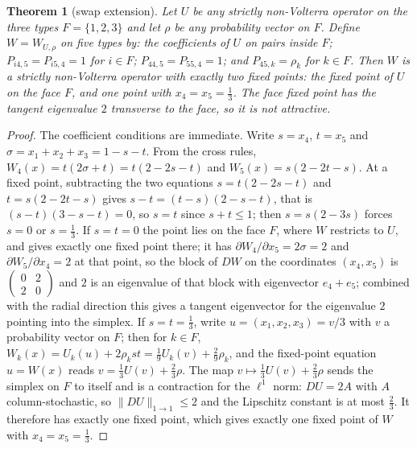 \documentclass[11pt]{amsart}
\newtheorem{theorem}{Theorem}[section]
\theoremstyle{definition}
\begin{document}
\begin{theorem}[swap extension]\label{thm:swap}
Let $U$ be any strictly non-Volterra operator on the three types $F=\{1,2,3\}$ and let $\rho$ be any probability vector on $F$. Define $W=W_{U,\rho}$ on five types by: the coefficients of $U$ on pairs inside $F$; $P_{i4,5}=P_{i5,4}=1$ for $i\in F$; $P_{44,5}=P_{55,4}=1$; and $P_{45,k}=\rho_k$ for $k\in F$. Then $W$ is a strictly non-Volterra operator with exactly two fixed points: the fixed point of $U$ on the face $F$, and one point with $x_4=x_5=\frac13$. The face fixed point has the tangent eigenvalue $2$ transverse to the face, so it is not attractive.
\end{theorem}

\begin{proof}
The coefficient conditions are immediate. Write $s=x_4$, $t=x_5$ and $\sigma=x_1+x_2+x_3=1-s-t$. From the cross rules, $W_4(x)=t(2\sigma+t)=t(2-2s-t)$ and $W_5(x)=s(2-2t-s)$. At a fixed point, subtracting the two equations $s=t(2-2s-t)$ and $t=s(2-2t-s)$ gives $s-t=(t-s)(2-s-t)$, that is $(s-t)(3-s-t)=0$, so $s=t$ since $s+t\le1$; then $s=s(2-3s)$ forces $s=0$ or $s=\frac13$. If $s=t=0$ the point lies on the face $F$, where $W$ restricts to $U$, and  gives exactly one fixed point there; it has $\partial W_4/\partial x_5=2\sigma=2$ and $\partial W_5/\partial x_4=2$ at that point, so the block of $DW$ on the coordinates $(x_4,x_5)$ is $\begin{pmatrix}0&2\\2&0\end{pmatrix}$ and $2$ is an eigenvalue of that block with eigenvector $e_4+e_5$; combined with the radial direction this gives a tangent eigenvector for the eigenvalue $2$ pointing into the simplex. If $s=t=\frac13$, write $u=(x_1,x_2,x_3)=v/3$ with $v$ a probability vector on $F$; then for $k\in F$, $W_k(x)=U_k(u)+2\rho_kst=\frac19U_k(v)+\frac29\rho_k$, and the fixed-point equation $u=W(x)$ reads $v=\frac13U(v)+\frac23\rho$. The map $v\mapsto\frac13U(v)+\frac23\rho$ sends the simplex on $F$ to itself and is a contraction for the $\ell^1$ norm: $DU=2A$ with $A$ column-stochastic, so $\|DU\|_{1\to1}\le2$ and the Lipschitz constant is at most $\frac23$. It therefore has exactly one fixed point, which gives exactly one fixed point of $W$ with $x_4=x_5=\frac13$.
\end{proof}
\end{document}
